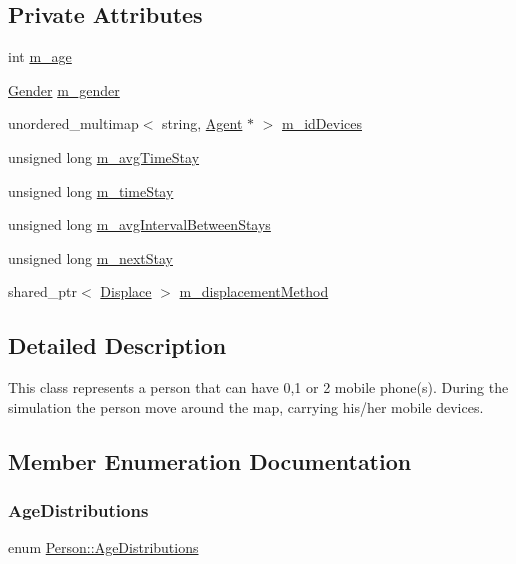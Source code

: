\subsection*{Private Attributes}
\begin{DoxyCompactItemize}
\item 
int \hyperlink{class_person_a743e071da10a5ac9150f61df919cfbb4}{m\+\_\+age}
\item 
\hyperlink{class_person_aff84ca16bd4dbf364614d86f20b29dd2}{Gender} \hyperlink{class_person_ade9cdf49acde95c75f19f0b0d24c8c9a}{m\+\_\+gender}
\item 
unordered\+\_\+multimap$<$ string, \hyperlink{class_agent}{Agent} $\ast$ $>$ \hyperlink{class_person_a95b2e60a54b72aea51a7600048e76291}{m\+\_\+id\+Devices}
\item 
unsigned long \hyperlink{class_person_a8c9502459dd59182d11f60f429b44457}{m\+\_\+avg\+Time\+Stay}
\item 
unsigned long \hyperlink{class_person_a5554109f1f3a7c466f02346d0061c6e7}{m\+\_\+time\+Stay}
\item 
unsigned long \hyperlink{class_person_a62a07c9565931a618a09be7510dde07c}{m\+\_\+avg\+Interval\+Between\+Stays}
\item 
unsigned long \hyperlink{class_person_ad8809184fc32b28b1bcc115b10493b55}{m\+\_\+next\+Stay}
\item 
shared\+\_\+ptr$<$ \hyperlink{class_displace}{Displace} $>$ \hyperlink{class_person_a92ceead10a7ca858d2151391e4421843}{m\+\_\+displacement\+Method}
\end{DoxyCompactItemize}


\subsection{Detailed Description}
This class represents a person that can have 0,1 or 2 mobile phone(s). During the simulation the person move around the map, carrying his/her mobile devices. 

\subsection{Member Enumeration Documentation}
\mbox{\label{class_person_a53376a9a5852ec7760488a01c37f0b0b}} 
\subsubsection{\texorpdfstring{Age\+Distributions}{AgeDistributions}}
{\footnotesize\ttfamily enum \hyperlink{class_person_a53376a9a5852ec7760488a01c37f0b0b}{Person\+::\+Age\+Distributions}}

